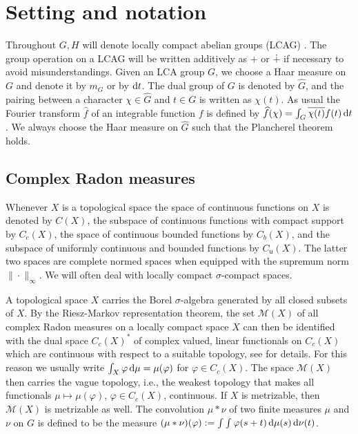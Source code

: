 \documentclass[11pt, a4wide]{amsart}
\newcommand{\ts}{\hspace{0.5pt}}
\newcommand{\CC}{\mathbb{C}\ts}
\newcommand{\dd}{\,{\rm d}}
\newcommand{\Ghat}{\widehat{G}}
\numberwithin{lemma}{section}
\begin{document}
\section{Setting and notation}\label{Sect}

Throughout $G, H$ will denote locally compact abelian groups (LCAG) \cite{Rei2,Fol,DE}. The group operation on a LCAG will be written additively as $+$ or $\dotplus$ if necessary to avoid
misunderstandings. Given an LCA group $G$, we choose a Haar measure on $G$ and denote it by $m_G$ or by
${\rm d} t$. The dual group of $G$ is denoted by $\Ghat$, and the
pairing between a character $\chi \in \Ghat$ and $t\in G$ is
written as $\chi(t)$. As usual the Fourier transform $\widehat{f}$
of an integrable function $f$ is defined by $\widehat{f} (\chi) =
\int_G \overline{\chi(t)} f(t) \, {\rm d}t$. We always choose the Haar measure on $\widehat G$ such that the Plancherel theorem \cite[Thm.~3.4.8]{DE} holds.



\subsection{Complex Radon measures}

Whenever $X$ is a topological space
the space of continuous functions on $X$ is denoted by $C(X)$, the subspace of continuous functions with compact
support by $C_c (X)$, the space of continuous bounded functions by $C_b (X)$, and the subspace of uniformly continuous and bounded functions by $C_\mathsf{u}(X)$. The latter two spaces are complete normed spaces when equipped with the supremum norm $\|\cdot\|_\infty$. We will often deal with locally compact $\sigma$-compact spaces.

\smallskip

A topological space $X$ carries the Borel $\sigma$-algebra generated
by all closed subsets of $X$.  By the Riesz-Markov representation
theorem, the set $\mathcal{M} (X)$ of all complex Radon
measures on a locally compact space $X$ can then be identified with the dual space $C_c
(X)^\ast$ of complex valued, linear functionals on $C_c(X)$ which are
continuous with respect to a suitable topology, see \cite[Ch.\
6.5]{Ped} for details. For this reason we usually write
 $\int_X \varphi \dd\mu =\mu(\varphi)$ for $\varphi\in C_c(X)$. 
The space $\mathcal{M} (X)$ then  carries the
vague topology, i.e., the weakest topology that makes all functionals
$\mu\mapsto \mu(\varphi)$, $\varphi\in C_c (X)$, continuous.
If $X$ is metrizable, then $\mathcal M(X)$ is metrizable as well. The convolution $\mu \ast \nu$ of two finite
measures $\mu$ and $\nu$ on $G$ is defined to be the measure $(\mu\ast \nu)
(\varphi) :=\int \int \varphi(s+t) \dd\mu(s) \dd\nu(t)$.
\end{document}
